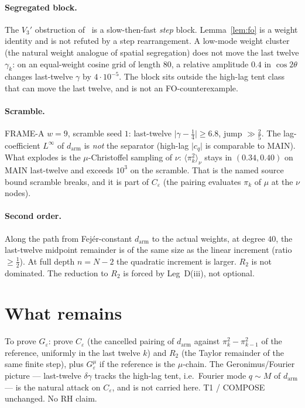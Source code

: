 \documentclass[11pt]{article}
\theoremstyle{remark}
\begin{document}
\paragraph{Segregated block.}
The $V_3'$ obstruction of~\cite{v3p} is a slow-then-fast
\emph{step} block.  Lemma~\ref{lem:fo} is a weight identity and
is not refuted by a step rearrangement.  A low-mode weight cluster
(the natural weight analogue of spatial segregation) does not move
the last twelve $\gamma_k$: on an equal-weight cosine grid of length
$80$, a relative amplitude $0.4$ in $\cos 2\theta$ changes last-twelve
$\gamma$ by $4\cdot 10^{-5}$.  The block sits outside the high-lag
tent class that can move the last twelve, and is not an FO-counterexample.

\paragraph{Scramble.}
FRAME-A $w=9$, scramble seed $1$: last-twelve
$\lvert\gamma-\tfrac14\rvert\ge 6.8$, jump $\gg\tfrac25$.
The lag-coefficient $L^\infty$ of $d_{\mathrm{arm}}$ is
\emph{not} the separator (high-lag $\lvert c_q\rvert$ is comparable
to MAIN).  What explodes is the $\mu$-Christoffel sampling of $\nu$:
$\langle\pi_k^2\rangle_\nu$ stays in $(0.34,0.40)$ on MAIN last-twelve
and exceeds $10^3$ on the scramble.  That is the named source bound
scramble breaks, and it is part of $C_\varepsilon$ (the pairing
evaluates $\pi_k$ of $\mu$ at the $\nu$ nodes).

\paragraph{Second order.}
Along the path from Fej\'er-constant $d_{\mathrm{arm}}$ to the actual
weights, at degree $40$, the last-twelve midpoint remainder is of
the same size as the linear increment (ratio $\ge\tfrac12$).
At full depth $n=N-2$ the quadratic increment is larger.
$R_2$ is not dominated.  The reduction to $R_2$ is forced by
Leg~D(iii), not optional.

\section{What remains}\label{sec:rest}

To prove $G_\varepsilon$: prove $C_\varepsilon$ (the cancelled
pairing of $d_{\mathrm{arm}}$ against $\pi_k^2-\pi_{k-1}^2$ of the
reference, uniformly in the last twelve $k$) and $R_2$ (the Taylor
remainder of the same finite step), plus $G_\varepsilon^\mu$ if the
reference is the $\mu$-chain.
The Geronimus/Fourier picture --- last-twelve $\delta\gamma$ tracks
the high-lag tent, i.e.\ Fourier mode $q\sim M$ of $d_{\mathrm{arm}}$
--- is the natural attack on $C_\varepsilon$, and is not carried
here.  T1 / COMPOSE unchanged.  No RH claim.
\end{document}
